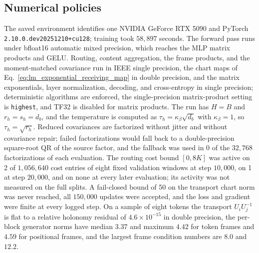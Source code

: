 \documentclass[twoside,11pt]{article}
\begin{document}
\subsection{Numerical policies}
\label{app:run_numerics}

The saved environment identifies one NVIDIA GeForce RTX 5090 and PyTorch \texttt{2.10.0.dev20251210+cu128}; %
training took $58{,}897$ seconds. %
The forward pass runs under bfloat16 automatic mixed precision, which reaches the MLP matrix products and GELU. Routing, content aggregation, the frame products, and the moment-matched covariance run in IEEE single precision, the chart maps of Eq.~\eqref{eq:lm_exponential_receiving_map} in double precision, and the matrix exponentials, layer normalization, decoding, and cross-entropy in single precision; deterministic algorithms are enforced, the single-precision matrix-product setting is \texttt{highest}, and TF32 is disabled for matrix products. %
The run has $H=B$ and $r_h=s_h=d_b$, and the temperature is computed as $\tau_h=\kappa_\beta\sqrt{d_b}$ with $\kappa_\beta=1$, so $\tau_h=\sqrt{r_h}$. %
Reduced covariances are factorized without jitter and without covariance repair; failed factorizations would fall back to a double-precision square-root QR of the source factor, and the fallback was used in 0 of the $32{,}768$ factorizations of each evaluation. %
The routing cost bound $[0,8K]$ was active on 2 of $1{,}056{,}640$ cost entries of eight fixed validation windows at step $10{,}000$, on 1 at step $20{,}000$, and on none at every later evaluation; its activity was not measured on the full splits. %
A fail-closed bound of 50 on the transport chart norm was never reached, all $150{,}000$ updates were accepted, and the loss and gradient were finite at every logged step. %
On a sample of eight tokens the transport $U_iU_j^{-1}$ is flat to a relative holonomy residual of $4.6\times10^{-15}$ in double precision, the per-block generator norms have median $3.37$ and maximum $4.42$ for token frames and $4.59$ for positional frames, and the largest frame condition numbers are $8.0$ and $12.2$. %
\end{document}

